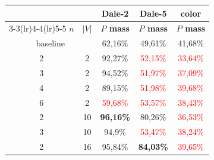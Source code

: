 \documentclass[11pt]{article}
\begin{document}


\begin{table}[ht]
        
        \centering
        \begin{tabular}{cc|c|c|c}
                \toprule
                                              &           & \multicolumn{1}{c}{\textbf{Dale-2}} & \multicolumn{1}{c}{\textbf{Dale-5}} & \multicolumn{1}{c}{\textbf{color}} \\  \cmidrule(lr){3-3}\cmidrule(lr){4-4}\cmidrule(lr){5-5}
                $n$                           & $|V|$     & \textbf{$P$ mass}                   & \textbf{$P$ mass}                   & \textbf{$P$ mass}                  \\\midrule
                \multicolumn{2}{c|}{baseline} & {62,16\%} & {49,61\%}                           & {41,68\%}                                                                \\\midrule
                {2}                           & {2}       & {92,27\%}                           & \textcolor{red}{52,15\%}            & \textcolor{red}{33,64\%}           \\
                {3}                           & {2}       & {94,52\%}                           & \textcolor{red}{51,97\%}            & \textcolor{red}{37,09\%}           \\
                {4}                           & {2}       & {89,15\%}                           & \textcolor{red}{51,98\%}            & \textcolor{red}{39,68\%}           \\
                {6}                           & {2}       & \textcolor{red}{59,68\%}            & \textcolor{red}{53,57\%}            & \textcolor{red}{38,43\%}           \\
                {2}                           & {10}      & \textbf{96,16\%}                    & {80,26\%}                           & \textcolor{red}{36,53\%}           \\
                {3}                           & {10}      & {94,9\%}                            & \textcolor{red}{53,47\%}            & \textcolor{red}{38,24\%}           \\
                {2}                           & {16}      & {95,84\%}                           & \textbf{84,03\%}                    & \textcolor{red}{39,65\%}           \\

\end{tabular}
\end{table}
\end{document}
